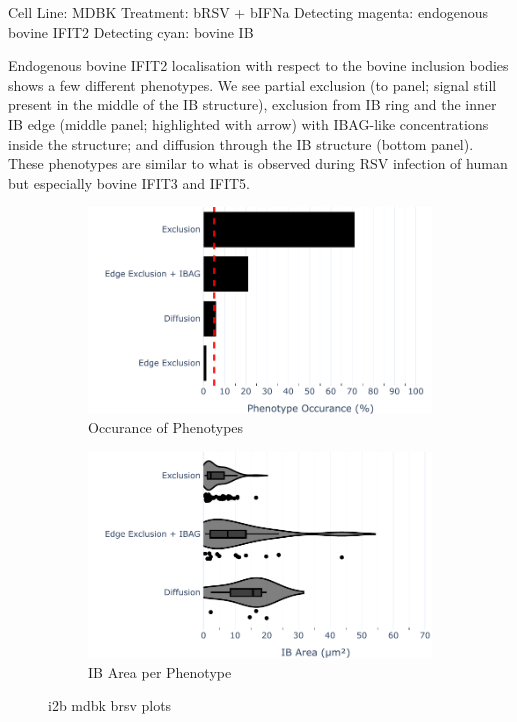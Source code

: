 Cell Line: MDBK \newline
Treatment: bRSV + bIFNa \newline
Detecting magenta: endogenous bovine IFIT2  \newline
Detecting cyan: bovine IB \newline

Endogenous bovine IFIT2 localisation with respect to the bovine inclusion bodies shows a few different phenotypes. We see partial exclusion (to panel; signal still present in the middle of the IB structure), exclusion from IB ring and the inner IB edge (middle panel; highlighted with arrow) with IBAG-like concentrations inside the structure; and diffusion through the IB structure (bottom panel). These phenotypes are similar to what is observed during RSV infection of human but especially bovine IFIT3 and IFIT5.

\begin{figure}
    \begin{subfigure}{0.5\textwidth}
        \includegraphics[width=1\linewidth]{10. Chapter 5/Figs/01. Infection/02. IFIT2B/10. bar_i2b_mdbk.pdf} 
        \caption[]{Occurance of Phenotypes}
    \end{subfigure}
    \begin{subfigure}{0.5\textwidth}
        \includegraphics[width=1\linewidth]{10. Chapter 5/Figs/01. Infection/02. IFIT2B/11. violin_i2b_mdbk.pdf}
        \caption[]{IB Area per Phenotype}
    \end{subfigure}
    \caption[i2b mdbk brsv plots]{i2b mdbk brsv plots}
    \label{fig:i2b mdbk brsv plots}
\end{figure}

